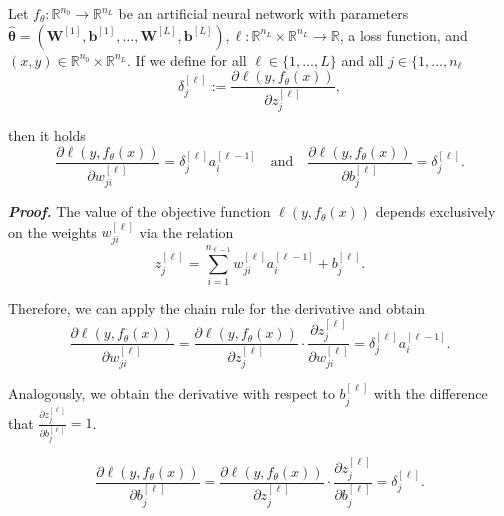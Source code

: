 \begin{lemma}\label{partial_derivative}
Let $f_{\theta}: \mathbb{R}^{n_0} \rightarrow \mathbb{R}^{n_L}$ be an artificial neural network with parameters $\hat{\boldsymbol{\theta}} = (\boldsymbol{W}^{[1]}, \boldsymbol{b}^{[1]}, \ldots, \boldsymbol{W}^{[L]}, \boldsymbol{b}^{[L]}), \ell: \mathbb{R}^{n_L} \times \mathbb{R}^{n_L} \rightarrow \mathbb{R}$, a loss function, and $(x, y) \in \mathbb{R}^{n_0} \times \mathbb{R}^{n_L}$. If we define for all $\ell \in \{1, \ldots, L\}$ and all $j \in \{1, \ldots, n_{\ell}$
\begin{equation}
    \delta_j^{[\ell]} := \frac{\partial \ell (y, f_\theta (x))}{\partial z_j^{[\ell]}} ,
    \label{eqn:57}
\end{equation}

then it holds
\begin{equation}
    \frac{\partial \ell(y, f_\theta(x))}{\partial w_{ji}^{[\ell]}} = \delta_j^{[\ell]} a_i^{[\ell-1]}
    \quad \text{and} \quad
    \frac{\partial \ell(y, f_\theta(x))}{\partial b_j^{[\ell]}} = \delta_j^{[\ell]}.
    \label{eqn:58}
\end{equation}
\end{lemma}

\textbf{\emph{Proof.}} The value of the objective function $\ell(y, f_\theta(x))$ depends exclusively on the weights $w_{ji}^{[\ell]}$ via the relation
\begin{equation}
z_j^{[\ell]} = \sum_{i=1}^{n_{\ell-1}} w_{ji}^{[\ell]} a_i^{[\ell-1]} + b_j^{[\ell]}.
\label{eqn:59}
\end{equation}

Therefore, we can apply the chain rule for the derivative and obtain
\begin{equation}
\frac{\partial \ell(y, f_\theta(x))}{\partial w_{ji}^{[\ell]}} = \frac{\partial \ell(y, f_\theta(x))}{\partial z_j^{[\ell]}} \cdot \frac{\partial z_j^{[\ell]}}{\partial w_{ji}^{[\ell]}} = \delta_j^{[\ell]} a_i^{[\ell-1]}.
\label{eqn:60}
\end{equation}

Analogously, we obtain the derivative with respect to $b_j^{[\ell]}$ with the difference that $\frac{\partial z_j^{[\ell]}}{\partial b_j^{[\ell]}} = 1$.

\begin{equation}
\frac{\partial \ell(y, f_\theta(x))}{\partial b_j^{[\ell]}} = \frac{\partial \ell(y, f_\theta(x))}{\partial z_j^{[\ell]}} \cdot \frac{\partial z_j^{[\ell]}}{\partial b_j^{[\ell]}} = \delta_j^{[\ell]}.
\label{eqn:61}
\end{equation}

